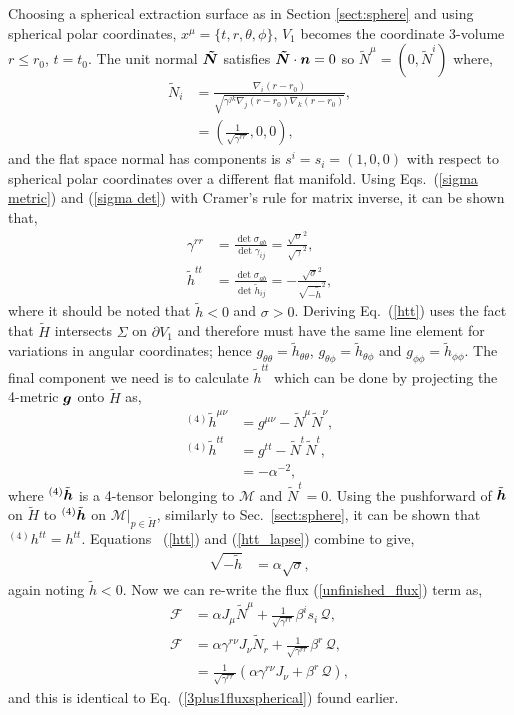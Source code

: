 Choosing a spherical extraction surface as in Section \ref{sect:sphere} and using spherical polar coordinates, $x^\mu = \{t,r,\theta,\phi\}$, $V_1$ becomes the coordinate 3-volume $r\leq r_0$, $t=t_0$. The unit normal $\boldsymbol{\tilde{N}}$ satisfies $\boldsymbol{\tilde{N}}\cdot \boldsymbol{n} =0$ so $\tilde N^\mu = (0,\tilde N^i)$ where, 
\begin{align}
\tilde N_i &= \frac{\nabla_i (r-r_0)}{\sqrt{\gamma^{jk}\nabla_j (r-r_0) \nabla_k (r-r_0)}}, \\ 
 &= (\frac{1}{\sqrt{\gamma^{rr}}},0,0),
\end{align}
and the flat space normal has components is $s^i = s_i = (1,0,0)$ with respect to spherical polar coordinates over a different flat manifold. Using Eqs.~(\ref{sigma metric}) and (\ref{sigma det}) with Cramer's rule for matrix inverse, it can be shown that,
\begin{align}
\gamma^{rr} &= \frac{\det \sigma_{ab}}{ \det \gamma_{ij}} = \frac{\sqrt{\sigma}^2}{\sqrt{\gamma}^2}, \\ 
\label{htt}\tilde{h}^{tt} &= \frac{\det \sigma_{ab}}{\det \tilde h_{ij}} = -\frac{\sqrt{\sigma}^2}{\sqrt{-\tilde h}^2},
\end{align}
where it should be noted that $\tilde h < 0$ and $\sigma > 0$. Deriving Eq.~(\ref{htt}) uses the fact that $\tilde H$ intersects $\Sigma$ on $\partial V_1$ and therefore must have the same line element for variations in angular coordinates; hence $g_{\theta\theta}=\tilde{h}_{\theta\theta}$, $g_{\theta\phi}=\tilde{h}_{\theta\phi}$ and $g_{\phi\phi}=\tilde{h}_{\phi\phi}$. The final component we need is to calculate $\tilde h^{tt}$ which can be done by projecting the 4-metric $\boldsymbol g$ onto $\tilde H$ as, 
\begin{align}
{}^{(4)}\tilde{h}^{\mu\nu} &= g^{\mu\nu} - \tilde{N}^\mu \tilde{N}^\nu,\\
{}^{(4)}\tilde{h}^{tt} &= g^{tt} - \tilde{N}^t\tilde{N}^t,\\
         \label{htt_lapse}      &= -\alpha^{-2},
\end{align}
where ${}^{(4)}\tilde{\boldsymbol{h}}$ is a 4-tensor belonging to $\mathcal{M}$ and $\tilde{N}^t=0$. Using the pushforward of $\tilde{\boldsymbol h}$ on $\tilde H$ to ${}^{(4)}\tilde{\boldsymbol h}$ on $\mathcal{M}\vert_{p\in{\tilde H}}$, similarly to Sec.~\ref{sect:sphere}, it can be shown that ${}^{(4)}h^{tt}=h^{tt}$. Equations ~(\ref{htt}) and (\ref{htt_lapse}) combine to give,
\begin{align}
  \sqrt{-\tilde{h}} &= \alpha \sqrt{\sigma},
\end{align}
again noting $\tilde h<0$. Now we can re-write the flux (\ref{unfinished_flux}) term as, 
\begin{align}
\mathcal{F} &= \alpha J_\mu \tilde N^\mu +  \frac{1}{\sqrt{\gamma^{rr}}}\beta^i s_i\, \mathcal{Q} , \\
\mathcal{F} &= \alpha\gamma^{ r\nu} J_\nu \tilde N_r +  \frac{1}{\sqrt{\gamma^{rr}}}\beta^r \, \mathcal{Q} , \\
            &= \frac{1}{\sqrt{\gamma^{rr}}}( \alpha \gamma^{ r\nu} J_\nu +  \beta^r \, \mathcal{Q} ), 
\end{align} 
and this is identical to Eq.~(\ref{3plus1fluxspherical}) found earlier.




